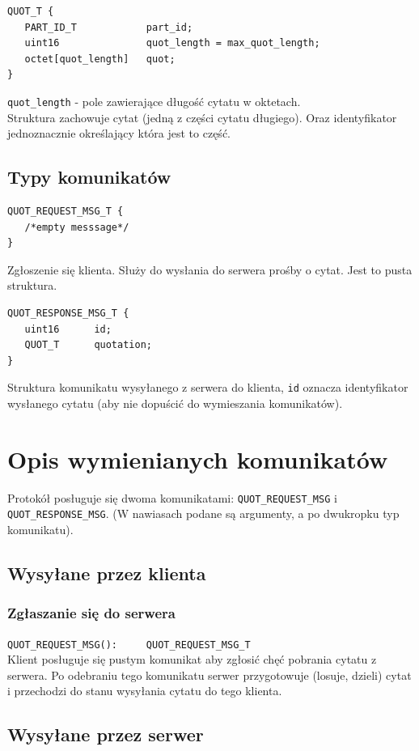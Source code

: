 \documentclass{article}
\begin{document}
\begin{verbatim}
QUOT_T {
   PART_ID_T            part_id;
   uint16               quot_length = max_quot_length;
   octet[quot_length]   quot;
}
\end{verbatim}
\verb+quot_length+ - pole zawierające długość cytatu w oktetach.\\
Struktura zachowuje cytat (jedną z części cytatu długiego). Oraz identyfikator jednoznacznie określający która jest to część.

\subsection{Typy komunikatów}
\begin{verbatim}
QUOT_REQUEST_MSG_T {
   /*empty messsage*/
}
\end{verbatim}
Zgłoszenie się klienta.
Służy do wysłania do serwera prośby o cytat. Jest to pusta struktura.

\begin{verbatim}
QUOT_RESPONSE_MSG_T {
   uint16      id;
   QUOT_T      quotation;
}
\end{verbatim}
Struktura komunikatu wysyłanego z serwera do klienta, \verb+id+ oznacza identyfikator wysłanego
cytatu (aby nie dopuścić do wymieszania komunikatów).

\section{Opis wymienianych komunikatów}
Protokół posługuje się dwoma komunikatami: \verb+QUOT_REQUEST_MSG+ i \verb+QUOT_RESPONSE_MSG+. 
(W nawiasach podane są argumenty, a po dwukropku typ komunikatu).
\subsection{Wysyłane przez klienta}
\subsubsection{Zgłaszanie się do serwera}
\verb+QUOT_REQUEST_MSG():     QUOT_REQUEST_MSG_T+\\
Klient posługuje się pustym komunikat aby zgłosić chęć pobrania cytatu z serwera.
Po odebraniu tego komunikatu serwer przygotowuje (losuje, dzieli) cytat i przechodzi do stanu wysyłania cytatu do tego klienta.
\subsection{Wysyłane przez serwer}
\end{document}
